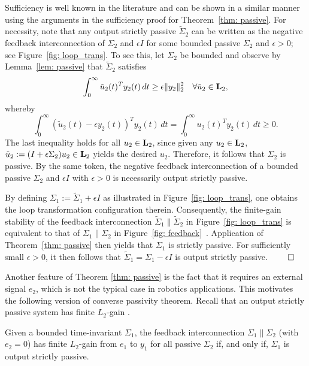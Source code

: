 \documentclass{ifacconf}
\newcommand{\Ltwo}{\boldsymbol{\rm L}_{2}}
\theoremstyle{definition}
\begin{document}
\begin{pf}
  Sufficiency is well known in the literature and can be shown in a similar manner using the arguments in the sufficiency proof for Theorem~\ref{thm:
    passive}. For necessity, note that any output strictly passive $\tilde{\Sigma}_2$ can be written as the negative feedback interconnection of
  $\Sigma_2$ and $\epsilon I$ for some bounded passive $\Sigma_2$ and $\epsilon > 0$; see Figure~\ref{fig: loop_trans}. To see this, let $\Sigma_2$ be
  bounded and observe by Lemma~\ref{lem: passive} that $\tilde{\Sigma}_2$ satisfies
\[
\int_0^\infty \tilde{u}_2(t)^T y_2(t) \, dt \geq \epsilon \|y_2\|_2^2 \quad \forall \tilde{u}_2 \in \Ltwo,
\]
whereby
\[
\int_0^\infty (\tilde{u}_2(t) - \epsilon y_2(t))^T y_2(t) \, dt = \int_0^\infty u_2(t)^T y_2(t) \, dt \geq 0.
\]
The last inequality holds for all $u_2 \in \Ltwo$, since given any $u_2 \in \Ltwo$, $\tilde{u}_2 := (I + \epsilon \Sigma_2)u_2 \in \Ltwo$ yields the
desired $u_2$. Therefore, it follows that $\Sigma_2$ is passive. By the same token, the negative feedback interconnection of a bounded passive
$\Sigma_2$ and $\epsilon I$ with $\epsilon > 0$ is necessarily output strictly passive. 

By defining $\Sigma_1 := \tilde{\Sigma}_1 + \epsilon I$ as illustrated in Figure~\ref{fig: loop_trans}, one obtains the loop transformation
configuration therein. Consequently, the finite-gain stability of the feedback interconnection $\tilde{\Sigma}_1 \| \tilde{\Sigma}_2$ in
Figure~\ref{fig: loop_trans} is equivalent to that of $\Sigma_1 \| \Sigma_2$ in Figure~\ref{fig: feedback}~\citep[Section 3.5]{GreLim95}. Application
of Theorem~\ref{thm: passive} then yields that $\Sigma_1$ is strictly passive. For sufficiently small $\epsilon > 0$, it then follows that
$\tilde{\Sigma}_1 = \Sigma_1 - \epsilon I$ is output strictly passive. \hfill$\qed$
\end{pf}

Another feature of Theorem \ref{thm: passive} is the fact that it requires an external signal $e_2$, which is not the typical case in robotics
applications. This motivates the following version of converse passivity theorem. Recall that an output strictly passive system has finite $L_2$-gain
\citep{Sch16}.

\begin{thm}
Given a bounded time-invariant $\Sigma_1$, the feedback interconnection $\Sigma_1 \| \Sigma_2$ (with $e_2=0$) has finite $L_2$-gain from $e_1$ to $y_1$ for all passive $\Sigma_2$ if, and only if, $\Sigma_1$ is output strictly passive.
\end{thm}
\end{document}
